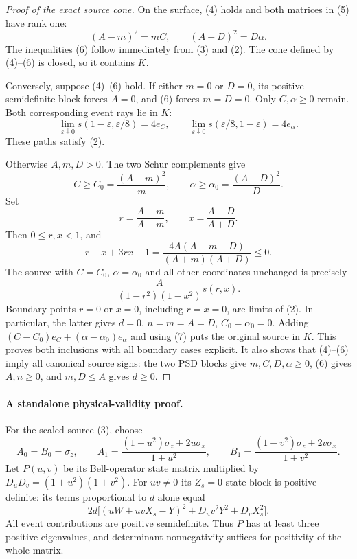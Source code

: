 \documentclass[11pt]{article}
\begin{document}
\begin{proof}[Proof of the exact source cone]
On the surface, (4) holds and both matrices in (5) have rank one:
\[
 (A-m)^2=mC,\qquad (A-D)^2=D\alpha.
\]
The inequalities (6) follow immediately from (3) and (2). The cone
defined by (4)--(6) is closed, so it contains $K$.

Conversely, suppose (4)--(6) hold. If either $m=0$ or $D=0$, its
positive semidefinite block forces $A=0$, and (6) forces $m=D=0$.
Only $C,\alpha\geq0$ remain. Both corresponding event rays lie in $K$:
\[
 \lim_{\varepsilon\downarrow0}s(1-\varepsilon,\varepsilon/8)
       =4e_C,\qquad
 \lim_{\varepsilon\downarrow0}s(\varepsilon/8,1-\varepsilon)
       =4e_\alpha.
                                                               \tag{7}
\]
These paths satisfy (2).

Otherwise $A,m,D>0$. The two Schur complements give
\[
 C\geq C_0=\frac{(A-m)^2}{m},\qquad
 \alpha\geq\alpha_0=\frac{(A-D)^2}{D}.
\]
Set
\[
 r=\frac{A-m}{A+m},\qquad x=\frac{A-D}{A+D}.
\]
Then $0\leq r,x<1$, and
\[
 r+x+3rx-1=\frac{4A(A-m-D)}{(A+m)(A+D)}\leq0.
\]
The source with $C=C_0$, $\alpha=\alpha_0$ and all other coordinates
unchanged is precisely
\[
 \frac{A}{(1-r^2)(1-x^2)}s(r,x).
\]
Boundary points $r=0$ or $x=0$, including $r=x=0$, are limits of (2).
In particular, the latter gives $d=0$, $n=m=A=D$, $C_0=\alpha_0=0$.
Adding $(C-C_0)e_C+(\alpha-\alpha_0)e_\alpha$ and using (7) puts the
original source in $K$. This proves both inclusions with all boundary
cases explicit. It also shows that (4)--(6) imply all canonical source
signs: the two PSD blocks give $m,C,D,\alpha\geq0$, (6) gives $A,n\geq0$,
and $m,D\leq A$ gives $d\geq0$.
\end{proof}

\paragraph{A standalone physical-validity proof.}
For the scaled source (3), choose
\[
 A_0=B_0=\sigma_z,\qquad
 A_1=\frac{(1-u^2)\sigma_z+2u\sigma_x}{1+u^2},\qquad
 B_1=\frac{(1-v^2)\sigma_z+2v\sigma_x}{1+v^2}.
\]
Let $P(u,v)$ be its Bell-operator state matrix multiplied by
$D_uD_v=(1+u^2)(1+v^2)$. For $uv\ne0$ its $Z_s=0$ state block is
positive definite: its terms proportional to $d$ alone equal
\[
 2d\bigl[(uW+uvX_s-Y)^2+D_uv^2Y^2+D_vX_s^2\bigr].       \tag{8}
\]
All event contributions are positive semidefinite. Thus $P$ has at least
three positive eigenvalues, and determinant nonnegativity suffices for
positivity of the whole matrix.
\end{document}
